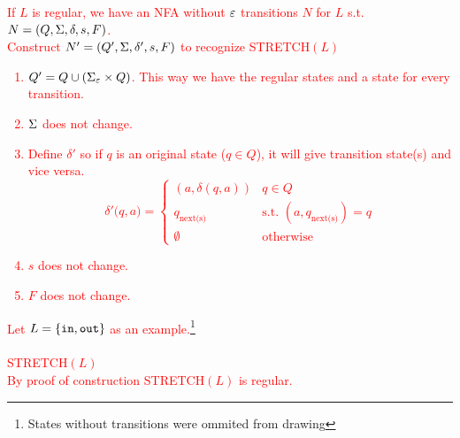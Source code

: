 \textcolor{red}{
    If $L$ is regular, we have an NFA without $\varepsilon$ transitions $N$ for $L$ s.t. $N = (Q, \Sigma, \delta, s, F)$.\\
    Construct $N'= (Q', \Sigma, \delta', s, F)$ to recognize STRETCH$(L)$\\
    \begin{enumerate}
        \item [1.]$Q'= Q \cup (\Sigma_\varepsilon \times Q)$. This way we have the regular states and a state for every transition.
        \item [2.] $\Sigma$ does not change.
        \item [3.] Define $\delta'$ so if $q$ is an original state ($q \in Q$), it will give transition state(s) and vice versa.
        \[
        \delta'\Big(q,a\Big)=  
        \begin{cases}
         (a,\delta(q,a)) & q \in Q  \\
         q_{\text{next(s)}}  & \text{s.t. } (a,q_{\text{next(s)}}) = q\\
         \emptyset & \text{otherwise}
        \end{cases}
        \]
        \item [4.] $s$ does not change.
        \item [5.] $F$ does not change.
    \end{enumerate}
    Let $L=\{\texttt{in},\texttt{out}\}$ as an example.\footnote{States without transitions were ommited from drawing}\\
    \\
    STRETCH$(L)$
    \\
    By proof of construction STRETCH$(L)$ is regular.
}